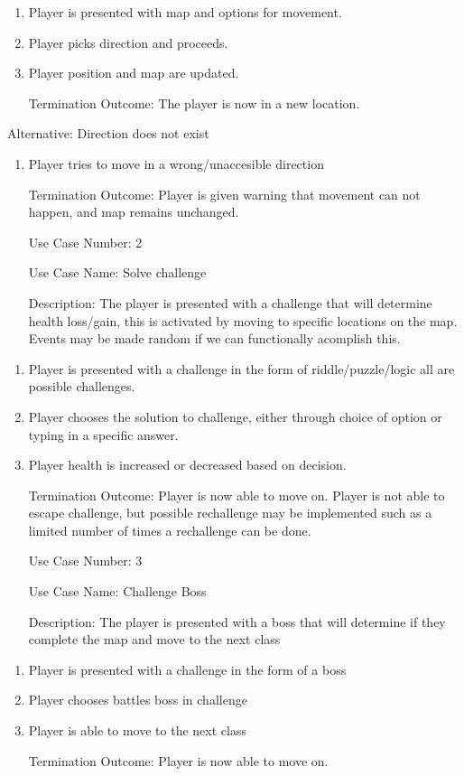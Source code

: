 \documentclass[10pt,conference,onecolumn,compsoc]{IEEEtran}
\begin{document}
\begin{enumerate}
\item Player is presented with map and options for movement.
\item Player picks direction and proceeds.
\item Player position and map are updated.
\item[Termination Outcome:] The player is now in a new location.
\end{enumerate}

Alternative: Direction does not exist
\begin{enumerate}
\item Player tries to move in a wrong/unaccesible direction
\item[Termination Outcome:] Player is given warning that movement can not happen, and map remains unchanged.
\end{enumerate}

\begin{itemize}
\item[Use Case Number:] 2
\item[Use Case Name:] Solve challenge
\item[Description:] The player is presented with a challenge that will determine health loss/gain, this is activated by moving to specific locations on the map. Events may be made random if we can functionally acomplish this.
\end{itemize}
\begin{enumerate}
\item Player is presented with a challenge in the form of riddle/puzzle/logic all are possible challenges.
\item Player chooses the solution to challenge, either through choice of option or typing in a specific answer.
\item Player health is increased or decreased based on decision.
\item[Termination Outcome:] Player is now able to move on. Player is not able to escape challenge, but possible rechallenge may be implemented such as a limited number of times a rechallenge can be done.
\end{enumerate}


\begin{itemize}
\item[Use Case Number:] 3
\item[Use Case Name:] Challenge Boss
\item[Description:] The player is presented with a boss that will determine if they complete the map and move to the next class
\end{itemize}
\begin{enumerate}
\item Player is presented with a challenge in the form of a boss 
\item Player chooses battles boss in challenge
\item Player is able to move to the next class
\item[Termination Outcome:] Player is now able to move on.
\end{enumerate}
\end{document}
